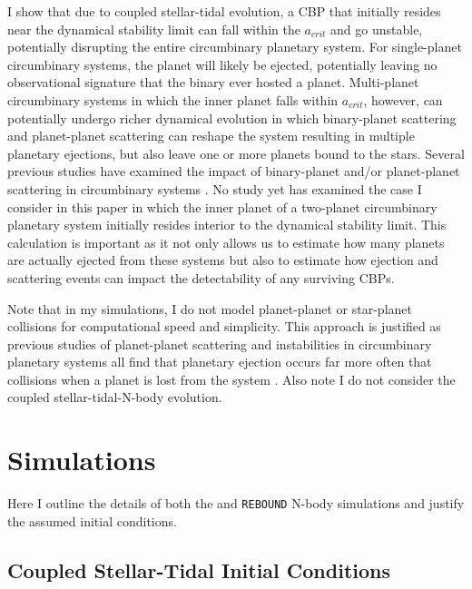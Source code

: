 I show that due to coupled stellar-tidal evolution, a CBP that initially resides near the dynamical stability limit can fall within the $a_{crit}$ and go unstable, potentially disrupting the entire circumbinary planetary system.  For single-planet circumbinary systems, the planet will likely be ejected, potentially leaving no observational signature that the binary ever hosted a planet.  Multi-planet circumbinary systems in which the inner planet falls within $a_{crit}$, however, can potentially undergo richer dynamical evolution in which binary-planet scattering and planet-planet scattering can reshape the system resulting in multiple planetary ejections, but also leave one or more planets bound to the stars.  Several previous studies have examined the impact of binary-planet and/or planet-planet scattering in circumbinary systems \citep[e.g.][]{Kratter2014,Smullen2016,Sutherland2016,Gong2017,Gong2017b}.  No study yet has examined the case I consider in this paper in which the inner planet of a two-planet circumbinary planetary system initially resides interior to the dynamical stability limit.  This calculation is important as it not only allows us to estimate how many planets are actually ejected from these systems but also to estimate how ejection and scattering events can impact the detectability of any surviving CBPs.

Note that in my simulations, I do not model planet-planet or star-planet collisions for computational speed and simplicity.  This approach is justified as previous studies of planet-planet scattering and instabilities in circumbinary planetary systems all find that planetary ejection occurs far more often that collisions when a planet is lost from the system \citep[see][]{Smullen2016,Sutherland2016}.  Also note I do not consider the coupled stellar-tidal-N-body evolution.


\section{Simulations} \label{STEEP:sec:simulations}

Here I outline the details of both the \vplanet and \texttt{REBOUND} N-body simulations and justify the assumed initial conditions.

\subsection{Coupled Stellar-Tidal Initial Conditions} \label{STEEP:sec:initial_conditions}

